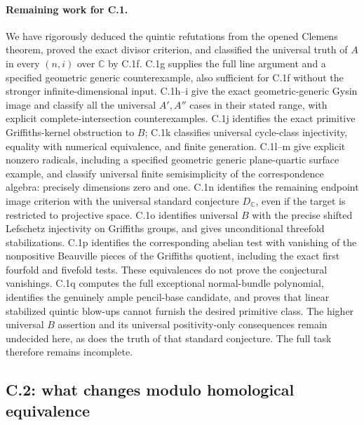 \paragraph{Remaining work for C.1.}
We have rigorously deduced the quintic refutations from the opened
Clemens theorem, proved the exact divisor criterion, and classified
the universal truth of $A$ in every $(n,i)$ over $\mathbb C$ by
C.1f. C.1g supplies the full line argument and a specified geometric
generic counterexample, also sufficient for C.1f without the stronger
infinite-dimensional input. C.1h--i give the exact geometric-generic
Gysin image and classify all the universal $A',A''$ cases in their
stated range, with explicit complete-intersection counterexamples.
C.1j identifies the exact primitive Griffiths-kernel obstruction to
$B$; C.1k classifies universal cycle-class injectivity, equality
with numerical equivalence, and finite generation. C.1l--m give
explicit nonzero radicals, including a specified geometric generic
plane-quartic surface example, and classify universal finite
semisimplicity of the correspondence algebra: precisely dimensions
zero and one. C.1n identifies the remaining endpoint image
criterion with the universal standard conjecture $D_{\mathbb C}$,
even if the target is restricted to projective space. C.1o identifies
universal $B$ with the precise shifted Lefschetz injectivity on
Griffiths groups, and gives unconditional threefold stabilizations.
C.1p identifies the corresponding abelian test with vanishing of
the nonpositive Beauville pieces of the Griffiths quotient, including
the exact first fourfold and fivefold tests. These equivalences do
not prove the conjectural vanishings. C.1q computes the full
exceptional normal-bundle polynomial, identifies the genuinely
ample pencil-base candidate, and proves that linear stabilized
quintic blow-ups cannot furnish the desired primitive class.
The higher
universal $B$ assertion and its universal positivity-only
consequences remain undecided here, as does the truth of that
standard conjecture.
The full task therefore remains incomplete.

\subsection{C.2: what changes modulo homological equivalence}

